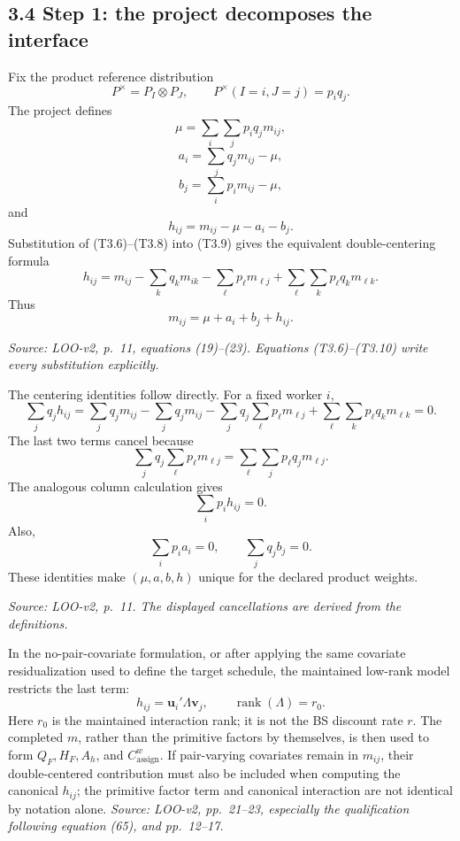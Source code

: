 \documentclass[11pt]{article}
\begin{document}
\subsection{3.4 Step 1: the project decomposes the interface}

Fix the product reference distribution
\[
P^\times=P_I\otimes P_J,
\qquad
P^\times(I=i,J=j)=p_iq_j.
\tag{T3.5}
\]
The project defines
\[
\mu=\sum_i\sum_jp_iq_jm_{ij},
\tag{T3.6}
\]
\[
a_i=\sum_jq_jm_{ij}-\mu,
\tag{T3.7}
\]
\[
b_j=\sum_ip_im_{ij}-\mu,
\tag{T3.8}
\]
and
\[
h_{ij}=m_{ij}-\mu-a_i-b_j.
\tag{T3.9}
\]
Substitution of (T3.6)--(T3.8) into (T3.9) gives the equivalent double-centering
formula
\[
h_{ij}
=
m_{ij}
-\sum_kq_km_{ik}
-\sum_\ell p_\ell m_{\ell j}
+\sum_\ell\sum_kp_\ell q_km_{\ell k}.
\tag{T3.10}
\]
Thus
\[
m_{ij}=\mu+a_i+b_j+h_{ij}.
\tag{T3.11}
\]

\textit{Source: LOO-v2, p.\ 11, equations (19)--(23).  Equations
(T3.6)--(T3.10) write every substitution explicitly.}

The centering identities follow directly.  For a fixed worker \(i\),
\[
\sum_jq_jh_{ij}
=
\sum_jq_jm_{ij}
-\sum_jq_jm_{ij}
-\sum_jq_j\sum_\ell p_\ell m_{\ell j}
+\sum_\ell\sum_kp_\ell q_km_{\ell k}
=0.
\tag{T3.12}
\]
The last two terms cancel because
\[
\sum_jq_j\sum_\ell p_\ell m_{\ell j}
=
\sum_\ell\sum_jp_\ell q_jm_{\ell j}.
\]
The analogous column calculation gives
\[
\sum_ip_ih_{ij}=0.
\tag{T3.13}
\]
Also,
\[
\sum_ip_ia_i=0,
\qquad
\sum_jq_jb_j=0.
\tag{T3.14}
\]
These identities make \((\mu,a,b,h)\) unique for the declared product weights.

\textit{Source: LOO-v2, p.\ 11.  The displayed cancellations are derived
from the definitions.}

In the no-pair-covariate formulation, or after applying the same covariate
residualization used to define the target schedule, the maintained low-rank
model restricts the last term:
\[
h_{ij}
=
\mathbf u_i'\Lambda\mathbf v_j,
\qquad
\operatorname{rank}(\Lambda)=r_0.
\tag{T3.15}
\]
Here \(r_0\) is the maintained interaction rank; it is not the BS discount
rate \(r\).  The completed \(m\), rather than the primitive factors by
themselves, is then used to form \(Q_F,H_F,A_h\), and
\(C^w_{\mathrm{assign}}\).
If pair-varying covariates remain in \(m_{ij}\), their double-centered
contribution must also be included when computing the canonical \(h_{ij}\);
the primitive factor term and canonical interaction are not identical by
notation alone.
\textit{Source: LOO-v2, pp.\ 21--23, especially the qualification following
equation (65), and pp.\ 12--17.}
\end{document}
